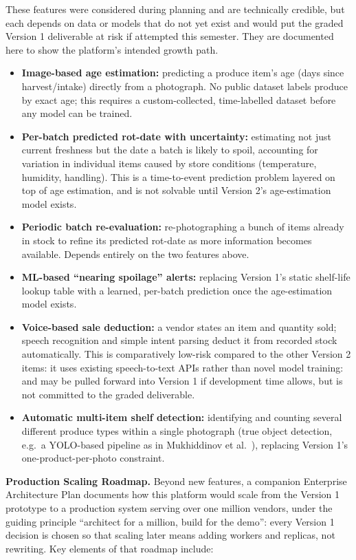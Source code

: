 \documentclass[12pt,a4paper]{article}
\begin{document}
These features were considered during planning and are technically credible, but each depends on data or models that do not yet exist and would put the graded Version 1 deliverable at risk if attempted this semester. They are documented here to show the platform's intended growth path.

\begin{itemize}[leftmargin=1.2cm]
    \item \textbf{Image-based age estimation:} predicting a produce item's age (days since harvest/intake) directly from a photograph. No public dataset labels produce by exact age; this requires a custom-collected, time-labelled dataset before any model can be trained.
    \item \textbf{Per-batch predicted rot-date with uncertainty:} estimating not just current freshness but the date a batch is likely to spoil, accounting for variation in individual items caused by store conditions (temperature, humidity, handling). This is a time-to-event prediction problem layered on top of age estimation, and is not solvable until Version 2's age-estimation model exists.
    \item \textbf{Periodic batch re-evaluation:} re-photographing a bunch of items already in stock to refine its predicted rot-date as more information becomes available. Depends entirely on the two features above.
    \item \textbf{ML-based ``nearing spoilage'' alerts:} replacing Version 1's static shelf-life lookup table with a learned, per-batch prediction once the age-estimation model exists.
    \item \textbf{Voice-based sale deduction:} a vendor states an item and quantity sold; speech recognition and simple intent parsing deduct it from recorded stock automatically. This is comparatively low-risk compared to the other Version 2 items: it uses existing speech-to-text APIs rather than novel model training: and may be pulled forward into Version 1 if development time allows, but is not committed to the graded deliverable.
    \item \textbf{Automatic multi-item shelf detection:} identifying and counting several different produce types within a single photograph (true object detection, e.g.\ a YOLO-based pipeline as in Mukhiddinov et al.~\cite{mukhiddinov2022}), replacing Version 1's one-product-per-photo constraint.
\end{itemize}

\newpage
\textbf{Production Scaling Roadmap.} Beyond new features, a companion Enterprise Architecture Plan documents how this platform would scale from the Version 1 prototype to a production system serving over one million vendors, under the guiding principle ``architect for a million, build for the demo'': every Version 1 decision is chosen so that scaling later means adding workers and replicas, not rewriting. Key elements of that roadmap include:
\end{document}
